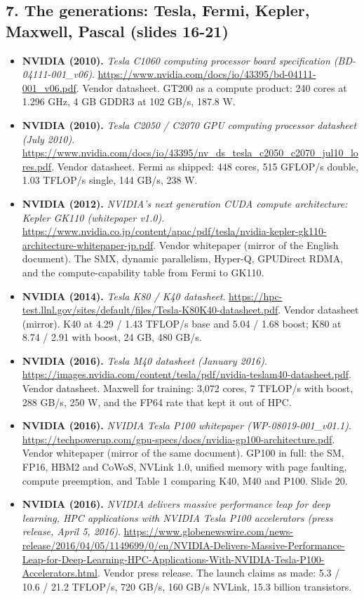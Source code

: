 \documentclass[11pt,letterpaper]{article}
\begin{document}
\subsection*{7. The generations: Tesla, Fermi, Kepler, Maxwell, Pascal (slides 16-21)}
\begin{itemize}[leftmargin=1.2em,itemsep=3pt]\sloppy
\item \textbf{NVIDIA (2010).} \textit{Tesla C1060 computing processor board specification (BD-04111-001\_v06)}. \url{https://www.nvidia.com/docs/io/43395/bd-04111-001_v06.pdf}. Vendor datasheet. GT200 as a compute product: 240 cores at 1.296 GHz, 4 GB GDDR3 at 102 GB/s, 187.8 W.
\item \textbf{NVIDIA (2010).} \textit{Tesla C2050 / C2070 GPU computing processor datasheet (July 2010)}. \url{https://www.nvidia.com/docs/io/43395/nv_ds_tesla_c2050_c2070_jul10_lores.pdf}. Vendor datasheet. Fermi as shipped: 448 cores, 515 GFLOP/s double, 1.03 TFLOP/s single, 144 GB/s, 238 W.
\item \textbf{NVIDIA (2012).} \textit{NVIDIA's next generation CUDA compute architecture: Kepler GK110 (whitepaper v1.0)}. \url{https://www.nvidia.co.jp/content/apac/pdf/tesla/nvidia-kepler-gk110-architecture-whitepaper-jp.pdf}. Vendor whitepaper (mirror of the English document). The SMX, dynamic parallelism, Hyper-Q, GPUDirect RDMA, and the compute-capability table from Fermi to GK110.
\item \textbf{NVIDIA (2014).} \textit{Tesla K80 / K40 datasheet}. \url{https://hpc-test.llnl.gov/sites/default/files/Tesla-K80K40-datasheet.pdf}. Vendor datasheet (mirror). K40 at 4.29 / 1.43 TFLOP/s base and 5.04 / 1.68 boost; K80 at 8.74 / 2.91 with boost, 24 GB, 480 GB/s.
\item \textbf{NVIDIA (2016).} \textit{Tesla M40 datasheet (January 2016)}. \url{https://images.nvidia.com/content/tesla/pdf/nvidia-teslam40-datasheet.pdf}. Vendor datasheet. Maxwell for training: 3,072 cores, 7 TFLOP/s with boost, 288 GB/s, 250 W, and the FP64 rate that kept it out of HPC.
\item \textbf{NVIDIA (2016).} \textit{NVIDIA Tesla P100 whitepaper (WP-08019-001\_v01.1)}. \url{https://techpowerup.com/gpu-specs/docs/nvidia-gp100-architecture.pdf}. Vendor whitepaper (mirror of the same document). GP100 in full: the SM, FP16, HBM2 and CoWoS, NVLink 1.0, unified memory with page faulting, compute preemption, and Table 1 comparing K40, M40 and P100. Slide 20.
\item \textbf{NVIDIA (2016).} \textit{NVIDIA delivers massive performance leap for deep learning, HPC applications with NVIDIA Tesla P100 accelerators (press release, April 5, 2016)}. \url{https://www.globenewswire.com/news-release/2016/04/05/1149699/0/en/NVIDIA-Delivers-Massive-Performance-Leap-for-Deep-Learning-HPC-Applications-With-NVIDIA-Tesla-P100-Accelerators.html}. Vendor press release. The launch claims as made: 5.3 / 10.6 / 21.2 TFLOP/s, 720 GB/s, 160 GB/s NVLink, 15.3 billion transistors.

\end{itemize}
\end{document}
